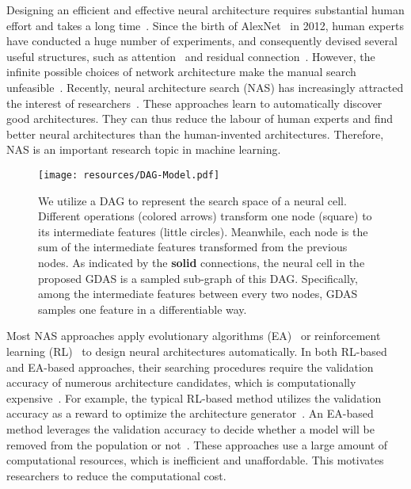 \documentclass[10pt,twocolumn,letterpaper]{article}
\begin{document}
Designing an efficient and effective neural architecture requires substantial human effort and takes a long time~\cite{cho2014learning,dong2017more,dong2018sbr,he2016deep,huang2017densely,krizhevsky2012imagenet,szegedy2015going,zhu2017bidirectional}.
Since the birth of AlexNet~\cite{krizhevsky2012imagenet} in 2012, human experts have conducted a huge number of experiments, and consequently devised several useful structures, such as attention~\cite{cho2014learning} and residual connection~\cite{he2016deep}.
However, the infinite possible choices of network architecture make the manual search unfeasible~\cite{baker2017designing}.
Recently, neural architecture search (NAS) has increasingly attracted the interest of researchers~\cite{baker2017designing,chen2018searching,kandasamy2018neural,Liu_2018_ECCV,luo2018neural,pmlr-v80-pham18a,zoph2017NAS}.
These approaches learn to automatically discover good architectures. They can thus reduce the labour of human experts and find better neural architectures than the human-invented architectures.
Therefore, NAS is an important research topic in machine learning.


\begin{figure}[t!]
\begin{center}
\texttt{[image: resources/DAG-Model.pdf]}
\end{center}
\caption[Captioning]{
We utilize a DAG to represent the search space of a neural cell.
Different operations (colored arrows) transform one node (square) to its intermediate features (little circles). Meanwhile, each node is the sum of the intermediate features transformed from the previous nodes.
As indicated by the \textbf{solid} connections, the neural cell in the proposed GDAS is a sampled sub-graph of this DAG.
Specifically, among the intermediate features between every two nodes, GDAS samples one feature in a differentiable way.
}
\label{fig:framework}
\end{figure}



Most NAS approaches apply evolutionary algorithms (EA)~\cite{real2019regularized,liu2018hierarchical,real2017large} or reinforcement learning (RL)~\cite{zoph2017NAS,Zoph_2018_CVPR,bello2017neural} to design neural architectures automatically.
In both RL-based and EA-based approaches, their searching procedures require the validation accuracy of numerous architecture candidates, which is computationally expensive~\cite{Zoph_2018_CVPR,real2019regularized}.
For example, the typical RL-based method utilizes the validation accuracy as a reward to optimize the architecture generator~\cite{zoph2017NAS}.
An EA-based method leverages the validation accuracy to decide whether a model will be removed from the population or not~\cite{real2017large}.
These approaches use a large amount of computational resources, which is inefficient and unaffordable.
This motivates researchers to reduce the computational cost.
\end{document}
